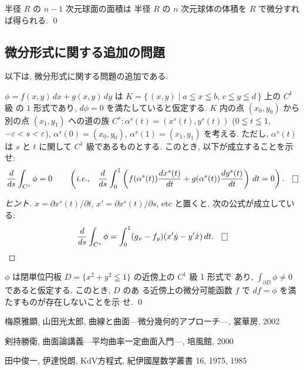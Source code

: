 \documentclass[12pt,twoside]{jarticle}
\begin{document}
\begin{guide}
半径 $R$ の $n-1$ 次元球面の面積は
半径 $R$ の $n$ 次元球体の体積を $R$ で微分すれば得られる.
\qed  
\end{guide}


\subsection{微分形式に関する追加の問題}

以下は, 微分形式に関する問題の追加である.

\begin{question}
  $\phi = f(x,y)\,dx + g(x,y)\,dy$ は %
  $K = \{\,(x,y)\mid a\leqq x\leqq b$, $c\leqq y \leqq d\,\}$ 上の $C^1$ 級
  の $1$ 形式であり, $d\phi = 0$ を満たしていると仮定する. 
  $K$ 内の点 $(x_0,y_0)$ から別の点 $(x_1, y_1)$ への道の族 
  $C^s : \alpha^s(t)=(x^s(t),y^s(t))$ ($0\leqq t\leqq 1$, $-\varepsilon<s<\varepsilon$),
  $\alpha^s(0)=(x_0,y_0)$, $\alpha^s(1)=(x_1,y_1)$ を考える. 
  ただし, $\alpha^s(t)$ は $s$ と $t$ に関して $C^1$ 級であるものとする. 
  このとき, 以下が成立することを示せ:
  \begin{equation*}
    \frac{d}{ds} \int_{C^s}\phi = 0
    \qquad
    \left(
      \text{{\it i.e.},}\quad
      \frac{d}{ds}
      \int_0^1 \left(
        f(\alpha^s(t))\frac{dx^s(t)}{dt} + g(\alpha^s(t))\frac{dy^s(t)}{dt}
      \right)\, dt
      = 0
    \right).
    \qed
  \end{equation*}
\end{question}

\begin{proof}[ヒント]
  $\dot x = \partial x^s(t)/\partial t$, 
  $x' = \partial x^s(t)/\partial s$, etc と置くと, 次の公式が成立している:
  \begin{equation*}
    \frac{d}{ds}\int_{C^s}\phi
    = \int_0^1 (g_x - f_y)(x'\dot y -  y'\dot x)\, dt.
    \qed
  \end{equation*}
\end{proof}

\begin{question}
  $\phi$ は閉単位円板 $D=\{x^2+y^2\leqq1\}$ の近傍上の $C^1$ 級 1 形式で
  あり, $\int_{\partial D} \phi \ne 0$ であると仮定する. このとき, $D$ のあ
  る近傍上の微分可能函数 $f$ で $df = \phi$ を満たすものが存在しないことを示
  せ. \qed
\end{question}


\begin{thebibliography}{AB}

 梅原雅顕, 山田光太郎, 曲線と曲面—微分幾何的アプローチ—, 
  裳華房, 2002

 剣持勝衛, 曲面論講義—平均曲率一定曲面入門—, 
  培風館, 2000
 
 田中俊一, 伊達悦朗, KdV方程式, 紀伊國屋数学叢書 16, 1975, 1985

\end{thebibliography}

\end{document}

